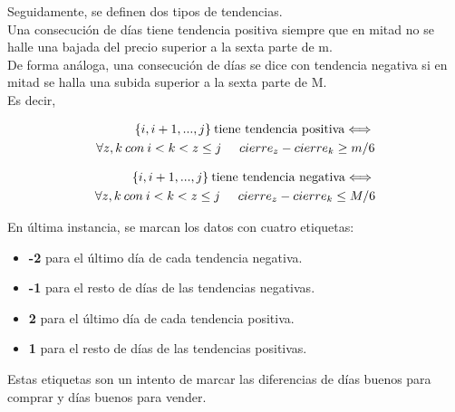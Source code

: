     Seguidamente, se definen dos tipos de tendencias.\\
    
    Una consecuci\'on de d\'ias tiene tendencia positiva siempre que en mitad no se halle una bajada del precio superior a la sexta parte de m.\\
    
    De forma an\'aloga, una consecuci\'on de d\'ias se dice con tendencia negativa si en mitad se halla una subida superior a la sexta parte de M.\\
    
    Es decir,
    
    \begin{align*}
    \begin{split}
        \{i,i+1,...,j\}\: \text{tiene tendencia positiva} \Longleftrightarrow{}\\
        \forall z,k\: con \:i < k < z\leq j\hspace{0.5cm} cierre_{z} - cierre_{k} \geq m/6
    \end{split}
    \end{align*}
    
    \begin{align*}
    \begin{split}
        \{i,i+1,...,j\}\: \text{tiene tendencia negativa} \Longleftrightarrow{}\\
        \forall z,k\: con \:i < k < z\leq j\hspace{0.5cm} cierre_{z} - cierre_{k} \leq M/6
    \end{split}
    \end{align*}

    En \'ultima instancia, se marcan los datos con cuatro etiquetas:
    \begin{itemize}
        \item \textbf{-2} para el \'ultimo d\'ia de cada tendencia negativa.
        \item \textbf{-1} para el resto de d\'ias de las tendencias negativas.
        \item \textbf{2} para el \'ultimo d\'ia de cada tendencia positiva.
        \item \textbf{1} para el resto de d\'ias de las tendencias positivas.
    \end{itemize}
    
    Estas etiquetas son un intento de marcar las diferencias de d\'ias buenos para comprar y d\'ias buenos para vender. \\
    
